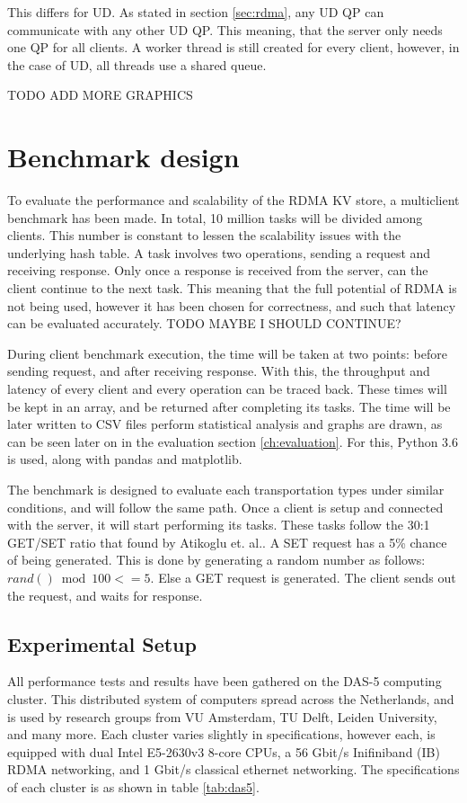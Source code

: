 This differs for UD.
As stated in section \ref{sec:rdma}, any UD QP can communicate with any other UD QP.
This meaning, that the server only needs one QP for all clients.
A worker thread is still created for every client, however, in the case of UD, all threads use a shared queue.

TODO ADD MORE GRAPHICS


\section{Benchmark design}\label{sec:benchmark-design}
To evaluate the performance and scalability of the RDMA KV store, a multiclient benchmark has been made.
In total, 10 million tasks will be divided among clients.
This number is constant to lessen the scalability issues with the underlying hash table.
A task involves two operations, sending a request and receiving response.
Only once a response is received from the server, can the client continue to the next task.
This meaning that the full potential of RDMA is not being used, however it has been chosen for correctness, and such that latency can be evaluated accurately. TODO MAYBE I SHOULD CONTINUE?

During client benchmark execution, the time will be taken at two points: before sending request, and after receiving response.
With this, the throughput and latency of every client and every operation can be traced back.
These times will be kept in an array, and be returned after completing its tasks.
The time will be later written to CSV files perform statistical analysis and graphs are drawn, as can be seen later on in the evaluation section \ref{ch:evaluation}.
For this, Python 3.6\cite{python} is used, along with pandas\cite{pandas} and matplotlib\cite{matplotlib}.

The benchmark is designed to evaluate each transportation types under similar conditions, and will follow the same path.
Once a client is setup and connected with the server, it will start performing its tasks.
These tasks follow the 30:1 GET/SET ratio that found by Atikoglu et. al.\cite{atikoglu2012workload}.
A SET request has a 5\% chance of being generated.
This is done by generating a random number as follows: $rand() \bmod 100 <= 5$.
Else a GET request is generated.
The client sends out the request, and waits for response.

\subsection{Experimental Setup}\label{subsec:experimental-setup}
All performance tests and results have been gathered on the DAS-5 computing cluster\cite{das5}.
This distributed system of computers spread across the Netherlands, and is used by research groups from VU Amsterdam, TU Delft, Leiden University, and many more.
Each cluster varies slightly in specifications, however each, is equipped with dual Intel E5-2630v3 8-core CPUs, a 56 Gbit/s Inifiniband (IB) RDMA networking, and 1 Gbit/s classical ethernet networking.
The specifications of each cluster is as shown in table \ref{tab:das5}.

